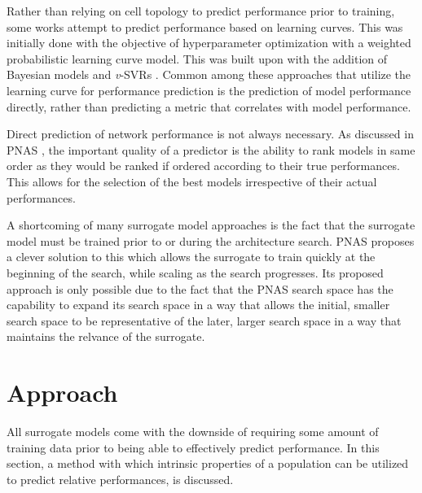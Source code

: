 \documentclass[twocolumn]{article}
\begin{document}
Rather than relying on cell topology to predict performance prior to training, some works attempt to predict performance based on learning curves.
This was initially done with the objective of hyperparameter optimization with a weighted probabilistic learning curve model\cite{hparam_opt_1}.
This was built upon with the addition of Bayesian models \cite{bayesian_pred} and \emph{v}-SVRs \cite{vsvr_pred}.
Common among these approaches that utilize the learning curve for performance prediction is the prediction of model performance directly,
rather than predicting a metric that correlates with model performance.

Direct prediction of network performance is not always necessary. 
As discussed in PNAS \cite{pnas}, the important quality of a predictor is the ability to rank models in same order as they would be ranked if ordered
according to their true performances.
This allows for the selection of the best models irrespective of their actual performances.

A shortcoming of many surrogate model approaches is the fact that the surrogate model must be trained prior to or during the architecture search.
PNAS \cite{pnas} proposes a clever solution to this which allows the surrogate to train quickly at the beginning of the search, while scaling as the search progresses.
Its proposed approach is only possible due to the fact that the PNAS search space has the capability to expand its search space in a way that
allows the initial, smaller search space to be representative of the later, larger search space in a way that maintains the relvance of the surrogate.


\section{Approach}

All surrogate models come with the downside of requiring some amount of training data prior to being able to effectively predict performance.
In this section, a method with which intrinsic properties of a population can be utilized to predict relative performances, is discussed.
\end{document}
